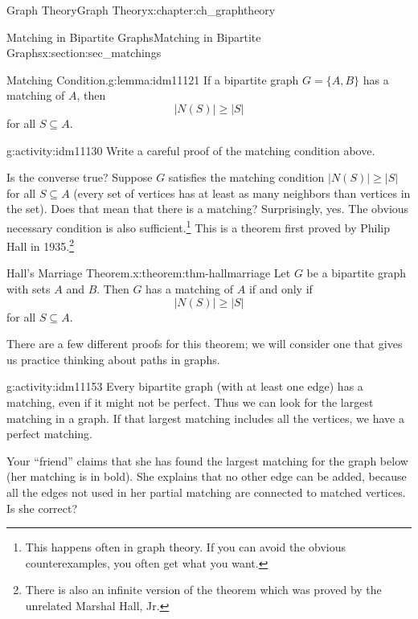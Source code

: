 \documentclass[oneside,10pt,]{book}
\numberwithin{equation}{chapter}
\begin{document}
\begin{chapterptx}{Graph Theory}{}{Graph Theory}{}{}{x:chapter:ch_graphtheory}
\begin{sectionptx}{Matching in Bipartite Graphs}{}{Matching in Bipartite Graphs}{}{}{x:section:sec_matchings}
\begin{lemma}{Matching Condition.}{}{g:lemma:idm11121}%
 If a bipartite graph \(G = \{A, B\}\) has a matching of \(A\), then%
\begin{equation*}
|N(S)| \ge |S|
\end{equation*}
for all \(S \subseteq A\).%
\end{lemma}
\begin{activity}{}{g:activity:idm11130}%
Write a careful proof of the matching condition above.%
\end{activity}
Is the converse true? Suppose \(G\) satisfies the matching condition \(|N(S)| \ge |S|\) for all \(S \subseteq A\) (every set of vertices has at least as many neighbors than vertices in the set). Does that mean that there is a matching? Surprisingly, yes. The obvious necessary condition is also sufficient.\footnote{This happens often in graph theory.  If you can avoid the obvious counterexamples, you often get what you want.\label{g:fn:idm11137}} This is a theorem first proved by Philip Hall in 1935.\footnote{There is also an infinite version of the theorem which was proved by the unrelated Marshal Hall, Jr.\label{g:fn:idm11138}}%
\begin{theorem}{Hall's Marriage Theorem.}{}{x:theorem:thm-hallmarriage}%
 Let \(G\) be a bipartite graph with sets \(A\) and \(B\). Then \(G\) has a matching of \(A\) if and only if%
\begin{equation*}
|N(S)| \ge |S|
\end{equation*}
for all \(S \subseteq A\).%
\end{theorem}
There are a few different proofs for this theorem; we will consider one that gives us practice thinking about paths in graphs.%
\begin{activity}{}{g:activity:idm11153}%
Every bipartite graph (with at least one edge) has a matching, even if it might not be perfect.  Thus we can look for the largest matching in a graph.  If that largest matching includes all the vertices, we have a perfect matching.%
\par
Your ``friend'' claims that she has found the largest matching for the graph below (her matching is in bold). She explains that no other edge can be added, because all the edges not used in her partial matching are connected to matched vertices. Is she correct?%
\begin{sidebyside}{1}{0.3}{0.3}{0}%
\begin{sbspanel}{0.4}%
\resizebox{\linewidth}{!}{%
}
\end{sbspanel}
\end{sidebyside}
\end{activity}
\end{sectionptx}
\end{chapterptx}
\end{document}
